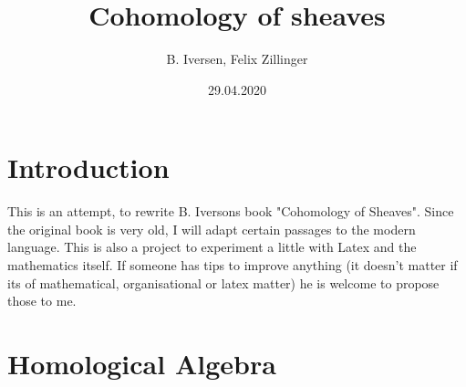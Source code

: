 \documentclass[5pt]{article}
\author{B. Iversen, Felix Zillinger}
\title{Cohomology of sheaves}
\date{29.04.2020}
\theoremstyle{definition}
\theoremstyle{remark}
\begin{document}
	\maketitle 
	\tableofcontents

	\newpage	
	
	\section*{Introduction}	
	
	This is an attempt, to rewrite B. Iversons book "Cohomology of Sheaves". Since the original book is very old, I will adapt certain passages to the modern language. 	This is also a project to experiment a little with Latex and the mathematics itself. If someone has tips to improve anything (it doesn't matter if its of mathematical, organisational or latex matter) he is welcome to propose those to me. 
	
	\section{Homological Algebra}
\end{document}
